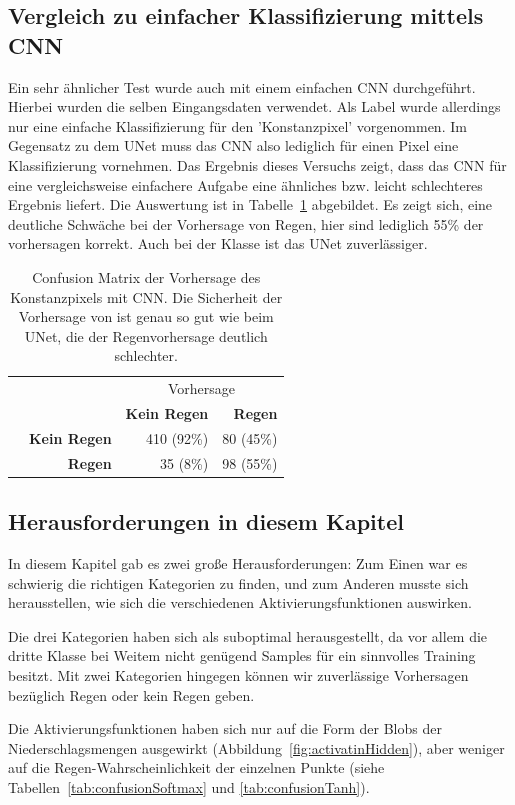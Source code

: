 \subsection{Vergleich zu einfacher Klassifizierung mittels CNN}
Ein sehr ähnlicher Test wurde auch mit einem einfachen CNN durchgeführt. Hierbei wurden die selben Eingangsdaten verwendet. Als Label wurde allerdings nur eine einfache Klassifizierung für den 'Konstanzpixel' vorgenommen. Im Gegensatz zu dem UNet muss das CNN also lediglich für einen Pixel eine Klassifizierung vornehmen. Das Ergebnis dieses Versuchs zeigt, dass das CNN für eine vergleichsweise einfachere Aufgabe eine ähnliches bzw. leicht schlechteres Ergebnis liefert. Die Auswertung ist in Tabelle~\ref{tab:confusionCNNkonstanz} abgebildet. Es zeigt sich, eine deutliche Schwäche bei der Vorhersage von Regen, hier sind lediglich 55\% der vorhersagen korrekt. Auch bei der Klasse  ist das UNet zuverlässiger.

\begin{table}[ht]
\centering
\begin{tabular}{lr|rr}
	&                      & \multicolumn{2}{c}{Vorhersage}\\
	&                      & \textbf{Kein Regen} & \textbf{Regen}\\\hline
	\multirow{3}{*}{\rotatebox{90}{Daten}}
	& \textbf{Kein Regen}  & 410 (92\%)          & 80 (45\%)\\
	& \textbf{Regen}       & 35 (8\%)            & 98 (55\%)\\
\end{tabular}
\caption[Confusion Matrix der Vorhersage des Konstanzpixels mit CNN]{Confusion Matrix der Vorhersage des Konstanzpixels mit CNN. Die Sicherheit der Vorhersage von  ist genau so gut wie beim UNet, die der Regenvorhersage deutlich schlechter.}
\label{tab:confusionCNNkonstanz}
\end{table}


\subsection{Herausforderungen in diesem Kapitel}
In diesem Kapitel gab es zwei große Herausforderungen: Zum Einen war es schwierig die richtigen Kategorien zu finden, und zum Anderen musste sich herausstellen, wie sich die verschiedenen Aktivierungsfunktionen auswirken.

Die drei Kategorien haben sich als suboptimal herausgestellt, da vor allem die dritte Klasse bei Weitem nicht genügend Samples für ein sinnvolles Training besitzt. Mit zwei Kategorien hingegen können wir zuverlässige Vorhersagen bezüglich Regen oder kein Regen geben.

Die Aktivierungsfunktionen haben sich nur auf die Form der Blobs der Niederschlagsmengen ausgewirkt (Abbildung~\ref{fig:activatinHidden}), aber weniger auf die Regen-Wahrscheinlichkeit der einzelnen Punkte (siehe Tabellen~\ref{tab:confusionSoftmax} und \ref{tab:confusionTanh}).
